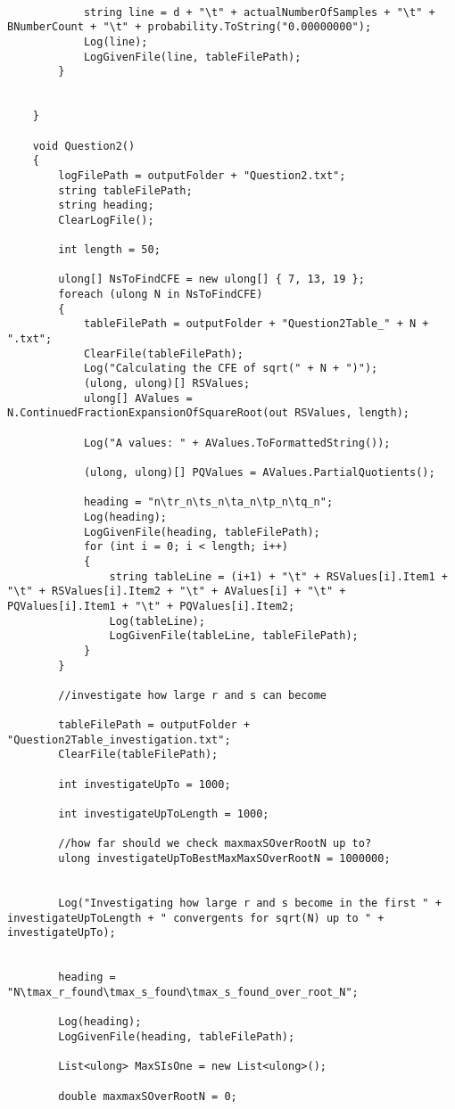 \documentclass{article}
\begin{document}
\begin{lstlisting}
			
			string line = d + "\t" + actualNumberOfSamples + "\t" + BNumberCount + "\t" + probability.ToString("0.00000000");
			Log(line);
			LogGivenFile(line, tableFilePath);
		}
		
		
	}
	
	void Question2()
	{
		logFilePath = outputFolder + "Question2.txt";
		string tableFilePath;
		string heading;
		ClearLogFile();
		
		int length = 50;
		
		ulong[] NsToFindCFE = new ulong[] { 7, 13, 19 };
		foreach (ulong N in NsToFindCFE)
		{
			tableFilePath = outputFolder + "Question2Table_" + N + ".txt";
			ClearFile(tableFilePath);
			Log("Calculating the CFE of sqrt(" + N + ")");
			(ulong, ulong)[] RSValues;
			ulong[] AValues = N.ContinuedFractionExpansionOfSquareRoot(out RSValues, length);
			
			Log("A values: " + AValues.ToFormattedString());
			
			(ulong, ulong)[] PQValues = AValues.PartialQuotients();
			
			heading = "n\tr_n\ts_n\ta_n\tp_n\tq_n";
			Log(heading);
			LogGivenFile(heading, tableFilePath);
			for (int i = 0; i < length; i++)
			{
				string tableLine = (i+1) + "\t" + RSValues[i].Item1 + "\t" + RSValues[i].Item2 + "\t" + AValues[i] + "\t" + PQValues[i].Item1 + "\t" + PQValues[i].Item2;
				Log(tableLine);
				LogGivenFile(tableLine, tableFilePath);
			}
		}
		
		//investigate how large r and s can become
		
		tableFilePath = outputFolder + "Question2Table_investigation.txt";
		ClearFile(tableFilePath);
		
		int investigateUpTo = 1000;
		
		int investigateUpToLength = 1000;
		
		//how far should we check maxmaxSOverRootN up to?
		ulong investigateUpToBestMaxMaxSOverRootN = 1000000;
		
		
		Log("Investigating how large r and s become in the first " + investigateUpToLength + " convergents for sqrt(N) up to " + investigateUpTo);
		
		
		heading = "N\tmax_r_found\tmax_s_found\tmax_s_found_over_root_N";
		
		Log(heading);
		LogGivenFile(heading, tableFilePath);
		
		List<ulong> MaxSIsOne = new List<ulong>();
		
		double maxmaxSOverRootN = 0;
		

\end{lstlisting}
\end{document}
